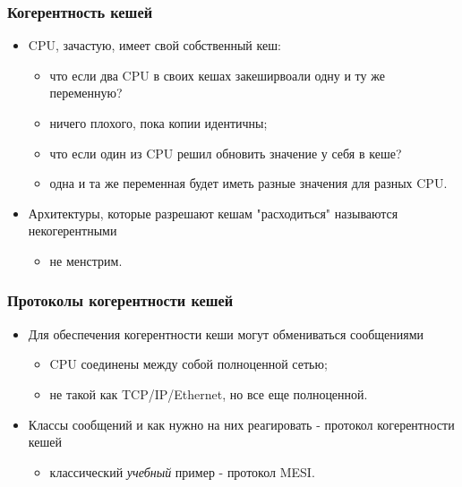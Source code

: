 \begin{frame}
\frametitle{Когерентность кешей}
\begin{itemize}
  \item CPU, зачастую, имеет свой собственный кеш:
  \begin{itemize}
    \item что если два CPU в своих кешах закеширвоали одну и ту же переменную?
    \item ничего плохого, пока копии идентичны;
    \item что если один из CPU решил обновить значение у себя в кеше?
    \item одна и та же переменная будет иметь разные значения для разных CPU.
  \end{itemize}
  \item Архитектуры, которые разрешают кешам "расходиться" называются
  некогерентными
  \begin{itemize}
    \item не менстрим.
  \end{itemize}
\end{itemize}
\end{frame}

\begin{frame}
\frametitle{Протоколы когерентности кешей}
\begin{itemize}
  \item Для обеспечения когерентности кеши могут обмениваться сообщениями
  \begin{itemize}
    \item CPU соединены между собой полноценной сетью;
    \item не такой как TCP/IP/Ethernet, но все еще полноценной.
  \end{itemize}
  \item Классы сообщений и как нужно на них реагировать - протокол когерентности
  кешей
  \begin{itemize}
    \item классический \emph{учебный} пример - протокол MESI.
  \end{itemize}
\end{itemize}
\end{frame}


